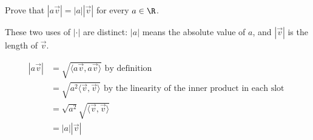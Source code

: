 \documentclass{ximera}
\begin{document}
Prove that $|a\vec{v}| = |a| |\vec{v}|$ for every $a \in \R$. 

\begin{warning}
  These two uses of $|\cdot|$ are distinct: $|a|$ means the absolute
  value of $a$, and $|\vec{v}|$ is the length of $\vec{v}$.
\end{warning}

\begin{free-response}
  \begin{align*}
    |a\vec{v}|
    &= \sqrt{\langle a\vec{v},a\vec{v}\rangle} \text{ by definition}\\
    &= \sqrt{a^2\langle \vec{v},\vec{v}\rangle} \text{ by the linearity of the inner product in each slot }\\
    &= \sqrt{a^2} \sqrt{\langle \vec{v},\vec{v}\rangle}\\
    &= |a| |\vec{v}|
  \end{align*}
\end{free-response}
\end{document}
